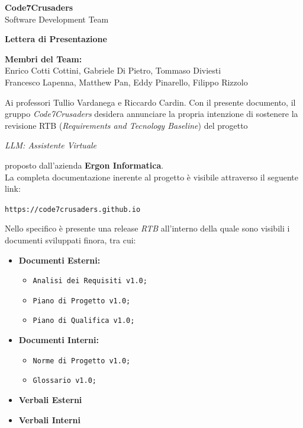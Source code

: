 \documentclass{article}
\begin{document}
\begin{titlepage}
    {\Huge \textbf{Code7Crusaders}}\\
    \vspace{0.5cm}
    {\Large Software Development Team}\\
    \vspace{2cm}
    
    {\large \textbf{Lettera di Presentazione}}\\
    \vspace{5cm}

    \textbf{Membri del Team:}\\
    Enrico Cotti Cottini, Gabriele Di Pietro, Tommaso Diviesti \\
    Francesco Lapenna, Matthew Pan, Eddy Pinarello, Filippo Rizzolo \\
    \vspace{0.5cm}
    
    \vspace{1cm}
\end{titlepage}

Ai professori Tullio Vardanega e Riccardo Cardin.
Con il presente documento, il gruppo \textit{Code7Crusaders} desidera annunciare la propria intenzione di sostenere
la revisione RTB (\textit{Requirements and Tecnology Baseline}) del progetto
\begin{center}
    \textit{LLM: Assistente Virtuale}
\end{center}
proposto dall'azienda \textbf{Ergon Informatica}.\\
La completa documentazione inerente al progetto è visibile attraverso il seguente link:
\begin{center}
    \texttt{https://code7crusaders.github.io}
\end{center}
Nello specifico è presente una release \textit{RTB} all'interno della quale sono visibili i documenti sviluppati finora, tra cui:
\begin{itemize}
    \item \textbf{Documenti Esterni:}
    \begin{itemize}
        \item \texttt{Analisi dei Requisiti v1.0;}
        \item \texttt{Piano di Progetto v1.0;}
        \item \texttt{Piano di Qualifica v1.0;}
    \end{itemize}
    \item \textbf{Documenti Interni:}
    \begin{itemize}
        \item \texttt{Norme di Progetto v1.0;}
        \item \texttt{Glossario v1.0;}
    \end{itemize}
    \item \textbf{Verbali Esterni}
    \item \textbf{Verbali Interni}
\end{itemize}
\end{document}
